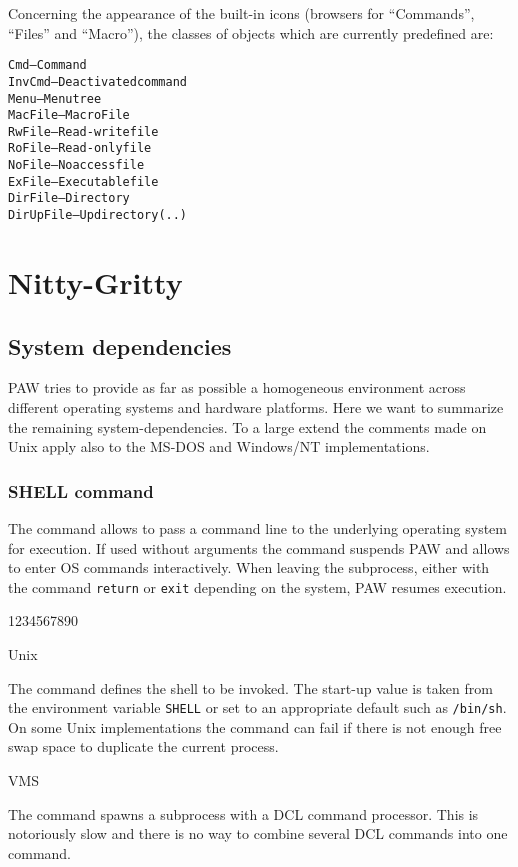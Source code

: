 Concerning the appearance of the built-in icons (browsers 
for ``Commands'', ``Files'' and ``Macro''), the classes of objects which are 
currently predefined are:
\begin{alltt}
    Cmd        -- Command
    InvCmd     -- Deactivated command
    Menu       -- Menu tree
    MacFile    -- Macro File
    RwFile     -- Read-write file
    RoFile     -- Read-only file
    NoFile     -- No access file
    ExFile     -- Executable file
    DirFile    -- Directory
    DirUpFile  -- Up directory (..)
\end{alltt}


\section{Nitty-Gritty}

\subsection{System dependencies}

PAW tries to provide as far as possible a homogeneous environment
across different operating systems and hardware platforms.
Here we want to summarize the remaining system-dependencies.
To a large extend the comments made on Unix apply also to the MS-DOS
and Windows/NT implementations.


\subsubsection{SHELL command}

The  command allows to pass a command line to the
underlying operating system for execution.
If used without arguments the  command suspends
PAW and allows to enter OS commands interactively.
When leaving the subprocess, either with the command \texttt{return} or
\texttt{exit} depending on the system, PAW resumes execution.

\begin{DL}{1234567890}
\item[Unix]

The command  defines the shell to be invoked.
The start-up value is taken from the environment variable \texttt{SHELL}
or set to an appropriate default such as \texttt{/bin/sh}.
On some Unix implementations the  command can fail if
there is not enough free swap space to duplicate the current process.


\item[VMS]

The  command spawns a subprocess with a DCL command processor.
This is notoriously slow and there is no way to combine several DCL
commands into one  command.

\end{DL}


